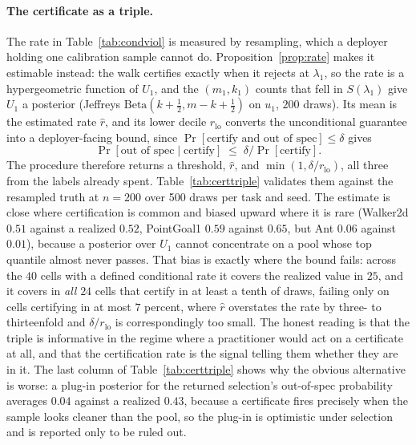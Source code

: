 \documentclass{article} %
\begin{document}
\paragraph{The certificate as a triple.} The rate in Table~\ref{tab:condviol} is measured by resampling, which a deployer holding one calibration sample cannot do. Proposition~\ref{prop:rate} makes it estimable instead: the walk certifies exactly when it rejects at $\lambda_1$, so the rate is a hypergeometric function of $U_1$, and the $(m_1, k_1)$ counts that fell in $S(\lambda_1)$ give $U_1$ a posterior (Jeffreys $\mathrm{Beta}(k + \tfrac12, m - k + \tfrac12)$ on $u_1$, $200$ draws). Its mean is the estimated rate $\hat r$, and its lower decile $r_{\mathrm{lo}}$ converts the unconditional guarantee into a deployer-facing bound, since $\Pr[\text{certify and out of spec}] \le \delta$ gives 
\[
  \Pr[\text{out of spec} \mid \text{certify}] \;\le\; \delta / \Pr[\text{certify}].
\]
The procedure therefore returns a threshold, $\hat r$, and $\min(1, \delta / r_{\mathrm{lo}})$, all three from the labels already spent. Table~\ref{tab:certtriple} validates them against the resampled truth at $n = 200$ over 500 draws per task and seed. The estimate is close where certification is common and biased upward where it is rare (Walker2d $0.51$ against a realized $0.52$, PointGoal1 $0.59$ against $0.65$, but Ant $0.06$ against $0.01$), because a posterior over $U_1$ cannot concentrate on a pool whose top quantile almost never passes. That bias is exactly where the bound fails: across the $40$ cells with a defined conditional rate it covers the realized value in $25$, and it covers in \emph{all} $24$ cells that certify in at least a tenth of draws, failing only on cells certifying in at most $7$ percent, where $\hat r$ overstates the rate by three- to thirteenfold and $\delta / r_{\mathrm{lo}}$ is correspondingly too small. The honest reading is that the triple is informative in the regime where a practitioner would act on a certificate at all, and that the certification rate is the signal telling them whether they are in it. The last column of Table~\ref{tab:certtriple} shows why the obvious alternative is worse: a plug-in posterior for the returned selection's out-of-spec probability averages $0.04$ against a realized $0.43$, because a certificate fires precisely when the sample looks cleaner than the pool, so the plug-in is optimistic under selection and is reported only to be ruled out.
\end{document}
